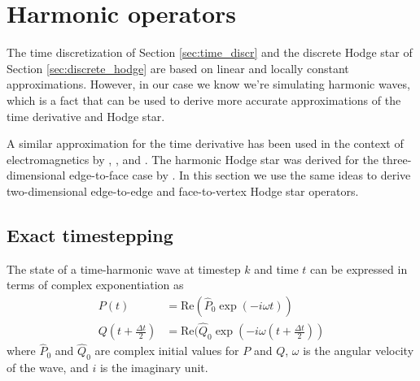 \documentclass[utf8,english]{gradu3}
\begin{document}
\section{Harmonic operators}\label{sec:harmonic_operators}

The time discretization of Section \ref{sec:time_discr}
and the discrete Hodge star of Section \ref{sec:discrete_hodge}
are based on linear and locally constant approximations.
However, in our case we know we're simulating harmonic waves,
which is a fact that can be used to derive more accurate approximations
of the time derivative and Hodge star.

A similar approximation for the time derivative has been used
in the context of electromagnetics by \textcite{ma_stability_2005},
\textcite{rabina_numerical_2014}, and \textcite{peng_em-waveholtz_2022}.
The harmonic Hodge star was derived for the three-dimensional
edge-to-face case by \textcite{rabina_numerical_2014}.
In this section we use the same ideas to derive
two-dimensional edge-to-edge and face-to-vertex Hodge star operators.


\subsection{Exact timestepping}\label{sec:exact_timestep}

The state of a time-harmonic wave at timestep $k$ and time $t$
can be expressed in terms of complex exponentiation as
\begin{align}
\label{eq:harmonic_pressure}
P(t) &= \text{Re}(\hat{P}_0 \exp(-i\omega t)) \\
\label{eq:harmonic_flux}
Q(t + \frac{\Delta t}{2}) &= \text{Re}(\hat{Q}_0 \exp(-i\omega (t + \frac{\Delta t}{2}))
\end{align}
where $\hat{P}_0$ and $\hat{Q}_0$ are complex initial values for $P$ and $Q$,
$\omega$ is the angular velocity of the wave, and $i$ is the imaginary unit.
\end{document}
